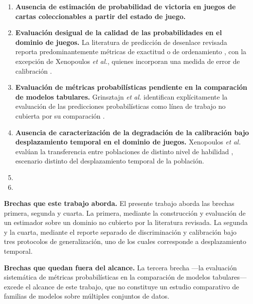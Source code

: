\begin{enumerate}
  \item \textbf{Ausencia de estimación de probabilidad de victoria en
        juegos de cartas coleccionables a partir del estado de juego.}
  \item \textbf{Evaluación desigual de la calidad de las probabilidades en
        el dominio de juegos.} La literatura de predicción de desenlace
        revisada reporta predominantemente métricas de exactitud o de
        ordenamiento \cite{hodge_winprediction_2021}, con la excepción de
        Xenopoulos \textit{et al.}, quienes incorporan una medida de error
        de calibración \cite{xenopoulos_winprob_2022}.
  \item \textbf{Evaluación de métricas probabilísticas pendiente en la
        comparación de modelos tabulares.} Grinsztajn \textit{et al.}
        identifican explícitamente la evaluación de las predicciones
        probabilísticas como línea de trabajo no cubierta por su
        comparación \cite{grinsztajn_trees_2022}.
  \item \textbf{Ausencia de caracterización de la degradación de la
        calibración bajo desplazamiento temporal en el dominio de juegos.}
        Xenopoulos \textit{et al.} evalúan la transferencia entre
        poblaciones de distinto nivel de habilidad
        \cite{xenopoulos_winprob_2022}, escenario distinto del
        desplazamiento temporal de la población.
  \item {}
  \item {}
\end{enumerate}


\noindent\textbf{Brechas que este trabajo aborda.} El presente trabajo
aborda las brechas primera, segunda y cuarta. La primera, mediante la
construcción y evaluación de un estimador sobre un dominio no cubierto por
la literatura revisada. La segunda y la cuarta, mediante el reporte
separado de discriminación y calibración bajo tres protocolos de
generalización, uno de los cuales corresponde a desplazamiento temporal.

\noindent\textbf{Brechas que quedan fuera del alcance.} La tercera brecha
---la evaluación sistemática de métricas probabilísticas en la comparación
de modelos tabulares--- excede el alcance de este trabajo, que no constituye
un estudio comparativo de familias de modelos sobre múltiples conjuntos de
datos. 


